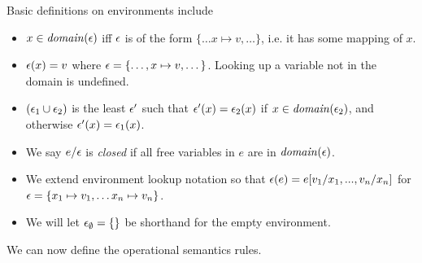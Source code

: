 \begin{definition}
  Basic definitions on environments include
  \begin{itemize}
  \item $x \in \mathit{domain}(\epsilon)$ iff $\epsilon$ is of the form $\{\dots x \mapsto v, \dots\}$, i.e. it has some mapping of $x$.
  \item $\epsilon(x) = v$ where $\epsilon = \{\dots, x \mapsto  v,\dots\}$.  Looking up a variable not in the domain is undefined.
  \item $(\epsilon_1 \cup \epsilon_2)$ is the least $\epsilon'$ such that $\epsilon'(x) = \epsilon_2(x)$ if $x \in \mathit{domain}(\epsilon_2)$, and otherwise $\epsilon'(x) = \epsilon_1(x)$.
  \item We say $e/\epsilon$ is \emph{closed} if all free variables in $e$ are in $\mathit{domain}(\epsilon)$.
  \item We extend environment lookup notation so that $\epsilon(e) = e[v_1/x_1,...,v_n/x_n]$ for $\epsilon = \{x_1 \mapsto v_1, \dots x_n \mapsto v_n\}$.
  \item We will let $\epsilon_\emptyset = \{\}$ be shorthand for the empty environment.
  \end{itemize}
\end{definition}

We can now define the operational semantics rules.

